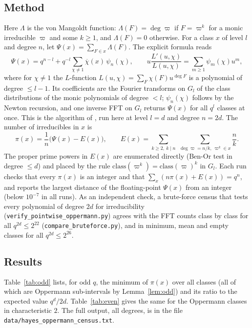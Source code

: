 \documentclass[11pt,a4paper]{amsart}
\theoremstyle{definition}
\theoremstyle{remark}
\begin{document}
\subsection{Method}
Here $\Lambda$ is the von Mangoldt function: $\Lambda(F)=\deg\varpi$ if $F=\varpi^k$ for a monic irreducible
$\varpi$ and some $k\ge1$, and $\Lambda(F)=0$ otherwise. For a class $x$ of level $l$ and degree $n$, let
$\Psi(x)=\sum_{F\in x}\Lambda(F)$. The explicit formula
\cite{Hayes,KR} reads
\begin{equation}\label{eq:explicit}
\Psi(x)=q^{n-l}+q^{-l}\sum_{\chi\ne1}\overline{\chi}(x)\,\psi_n(\chi),\qquad
u\frac{L'(u,\chi)}{L(u,\chi)}=\sum_{m\ge1}\psi_m(\chi)u^m,
\end{equation}
where for $\chi\ne1$ the $L$-function $L(u,\chi)=\sum_{F}\chi(F)u^{\deg F}$ is a polynomial of degree $\le l-1$. Its
coefficients are the Fourier transforms on $G_l$ of the class distributions of the monic polynomials of degree $<l$;
$\psi_n(\chi)$ follows by the Newton recursion, and one inverse FFT on $G_l$ returns $\Psi(x)$ for all $q^l$ classes
at once. This is the algorithm of \cite{ChenI}, run here at level $l=d$ and degree $n=2d$. The number of irreducibles
in $x$ is
\[
\pi(x)=\frac1n\bigl(\Psi(x)-E(x)\bigr),\qquad
E(x)=\sum_{k\ge2,\ k\mid n}\ \sum_{\deg\varpi=n/k,\ \varpi^k\in x}\frac nk .
\]
The proper prime powers in $E(x)$ are enumerated directly (Ben-Or test in degree $\le d$) and placed by the rule
$\mathrm{class}(\varpi^k)=\mathrm{class}(\varpi)^k$ in $G_l$. Each run checks that every $\pi(x)$ is
an integer and that $\sum_x(n\pi(x)+E(x))=q^n$, and reports the largest distance of the floating-point $\Psi(x)$ from
an integer (below $10^{-7}$ in all runs). As an independent check, a brute-force census that tests every polynomial
of degree $2d$ for irreducibility (\texttt{verify\_pointwise\_oppermann.py}) agrees with the FFT counts class by
class for all $q^{2d}\le2^{22}$ (\texttt{compare\_bruteforce.py}), and in minimum, mean and empty classes for all
$q^{2d}\le2^{26}$.

\subsection{Results}
Table~\ref{tab:odd} lists, for odd $q$, the minimum of $\pi(x)$ over all classes (all of which are Oppermann
sub-intervals by Lemma~\ref{lem:odd}) and its ratio to the expected value $q^d/2d$. Table~\ref{tab:even} gives the same for
the Oppermann classes in characteristic $2$. The full output, all degrees, is in the file\\ \texttt{data/hayes\_oppermann\_census.txt}.
\end{document}
